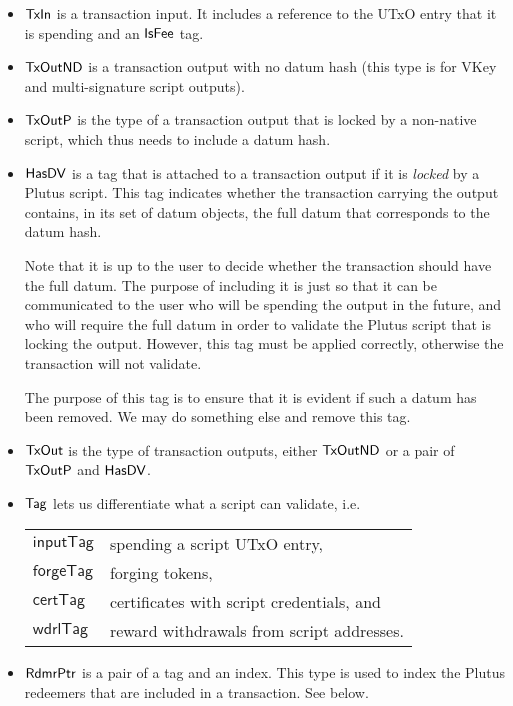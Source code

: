 \begin{itemize}
  \item $\mathsf{TxIn}$ is a transaction input. It includes a reference to the UTxO entry that it is spending
  and an $\mathsf{IsFee}$ tag.

  \item $\mathsf{TxOutND}$ is a transaction output with no datum hash
  (this type is for VKey and multi-signature script outputs).

  \item $\mathsf{TxOutP}$ is the type of a transaction output that is locked by
  a non-native script, which thus needs to include a datum hash.

  \item $\mathsf{HasDV}$
  is a tag that is attached to a transaction output if it is \emph{locked} by a Plutus
  script. This tag indicates whether the transaction carrying the output
  contains, in its set of datum objects, the full datum that corresponds
  to the datum hash.

  Note that it is up to the user to decide whether the transaction should have the full datum. The purpose of
  including it is just so that it can be communicated to the user who will be spending
  the output in the future, and who will require the full datum in order to validate
  the Plutus script that is locking the output. However, this tag must be applied
  correctly, otherwise the transaction will not validate.
  \begin{note}
    The purpose of this tag is to ensure that it is evident if such a
    datum has been removed. We may do something else and remove this tag.
  \end{note}

  \item $\mathsf{TxOut}$ is the type of transaction outputs, either
  $\mathsf{TxOutND}$ or a pair of $\mathsf{TxOutP}$ and $\mathsf{HasDV}$.

  \item $\mathsf{Tag}$ lets us differentiate what a script
  can validate, i.e. \\

  \begin{tabular}{l@{~to validate~}l}
  $\mathsf{inputTag}$ & spending a script UTxO entry, \\
  $\mathsf{forgeTag}$ & forging tokens, \\
  $\mathsf{certTag}$  & certificates with script credentials, and  \\
  $\mathsf{wdrlTag}$ & reward withdrawals from script addresses.
  \end{tabular}

  \item $\mathsf{RdmrPtr}$ is a pair of a tag and an index. This type is
  used to index the Plutus redeemers that are included in a transaction. See
  below.

\end{itemize}


